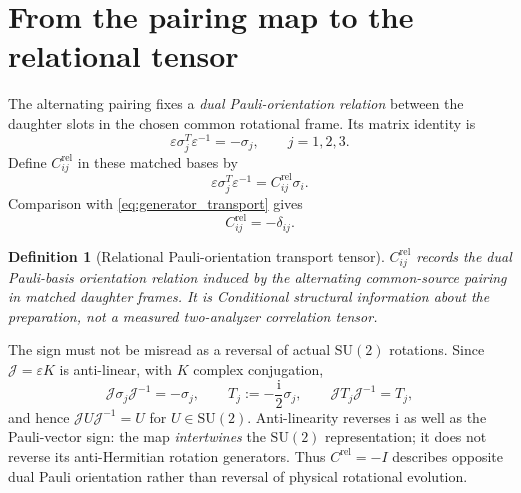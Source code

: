 \documentclass[11pt]{article}
\newtheorem{definition}[theorem]{Definition}
\theoremstyle{remark}
\newcommand{\ii}{\mathrm{i}}
\newcommand{\SU}{\mathrm{SU}(2)}
\newcommand{\epsm}{\varepsilon}
\newcommand{\Jmap}{\mathcal J}
\newcommand{\Crel}{C^{\mathrm{rel}}}
\begin{document}
\section{From the pairing map to the relational tensor}
\label{sec:relational_tensor}

The alternating pairing fixes a \emph{dual Pauli-orientation relation} between
the daughter slots in the chosen common rotational frame.  Its matrix identity is
\begin{equation}
  \epsm\sigma_j^T\epsm^{-1}=-\sigma_j,
  \qquad j=1,2,3.
  \label{eq:generator_transport}
\end{equation}
Define \(\Crel_{ij}\) in these matched bases by
\begin{equation}
  \epsm\sigma_j^T\epsm^{-1}
  =\Crel_{ij}\sigma_i.
  \label{eq:Crel_definition}
\end{equation}
Comparison with \eqref{eq:generator_transport} gives
\begin{equation}
  \boxed{\Crel_{ij}=-\delta_{ij}.}
  \label{eq:Crel}
\end{equation}

\begin{definition}[Relational Pauli-orientation transport tensor]
\(\Crel_{ij}\) records the dual Pauli-basis orientation relation induced
by the alternating common-source pairing in \emph{matched daughter frames}.
It is Conditional structural information about the preparation, not a
measured two-analyzer correlation tensor.
\end{definition}

The sign must not be misread as a reversal of actual \(\SU\) rotations.
Since \(\Jmap=\epsm K\) is anti-linear, with \(K\) complex conjugation,
\begin{equation}
  \Jmap\sigma_j\Jmap^{-1}=-\sigma_j,
  \qquad
  T_j:=-\frac{\ii}{2}\sigma_j,
  \qquad
  \boxed{\Jmap T_j\Jmap^{-1}=T_j},
  \label{eq:antilinear_rotation_guard}
\end{equation}
and hence \(\Jmap U\Jmap^{-1}=U\) for \(U\in\SU\).
Anti-linearity reverses \(\ii\) as well as the Pauli-vector sign: the map
\emph{intertwines} the \(\SU\) representation; it does not reverse
its anti-Hermitian rotation generators.  Thus \(\Crel=-I\) describes
opposite dual Pauli orientation rather than reversal of physical rotational
evolution.
\end{document}
